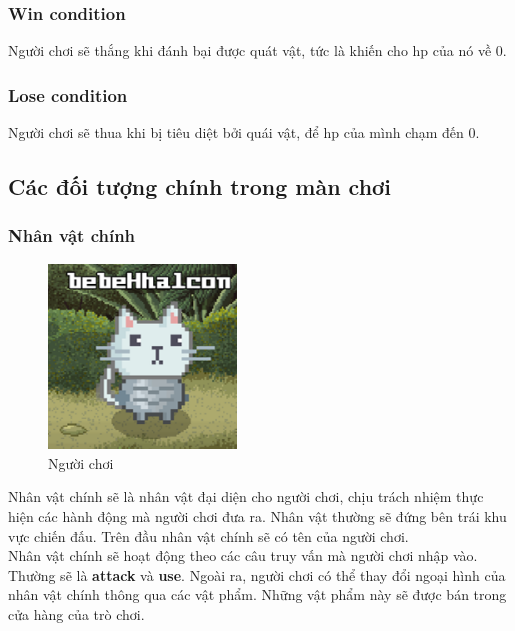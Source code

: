 \subsubsection{Win condition}
Người chơi sẽ thắng khi đánh bại được quát vật, tức là khiến cho hp của nó về 0.
\subsubsection{Lose condition}
Người chơi sẽ thua khi bị tiêu diệt bởi quái vật, để hp của mình chạm đến 0.
\subsection{Các đối tượng chính trong màn chơi}
\subsubsection{Nhân vật chính}
\begin{figure}[H]
	\centering
	\includegraphics[width=5cm]{Images/Player.png}
	\vspace{0.5cm}
	\caption{Người chơi}
\end{figure}
\hspace*{1cm} Nhân vật chính sẽ là nhân vật đại diện cho người chơi, chịu trách nhiệm thực hiện các hành động mà người chơi đưa ra. Nhân vật thường sẽ đứng bên trái khu vực chiến đấu. Trên đầu nhân vật chính sẽ có tên của người chơi.\\
\hspace*{1cm} Nhân vật chính sẽ hoạt động theo các câu truy vấn mà người chơi nhập vào. Thường sẽ là \textbf{attack} và \textbf{use}. Ngoài ra, người chơi có thể thay đổi ngoại hình của nhân vật chính thông qua các vật phẩm. Những vật phẩm này sẽ
được bán trong cửa hàng của trò chơi.
